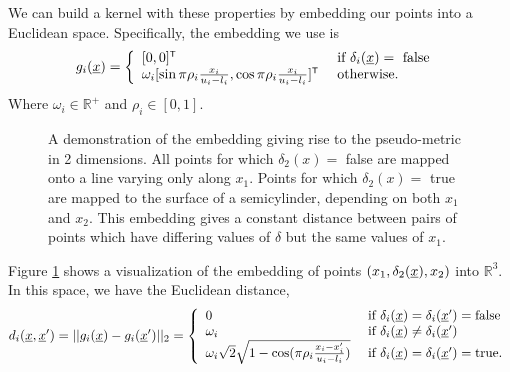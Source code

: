 \documentclass{article}
\newcommand{\vect}[1]{\underline{\smash{#1}}}
\renewcommand{\v}[1]{\vect{#1}}
\newcommand{\reals}{\mathds{R}}
\newcommand{\sX}{\mathcal{X}}
\newcommand{\br}{}%
\newcommand\transpose{{\textrm{\tiny{\sf{T}}}}}
\newcommand{\embeddingletter}{g}
\begin{document}
We can build a kernel with these properties by embedding our points into a Euclidean space.  Specifically, the embedding we use is
%
%
%
\begin{equation}
\embeddingletter_i\br(\v{x}) = \left\{\begin{array}{ll}
[0,0]^\transpose & \textrm{ if } \delta_i(\v{x}) = \textrm{ false }\\
\omega_i [\sin{\pi\rho_i\frac{x_i}{u_i-l_i}}, \cos{\pi\rho_i\frac{x_i}{u_i-l_i}}]^\transpose & \textrm{ otherwise.}\end{array}\right.
\end{equation}
Where $\omega_i \in \mathbb{R}^+$ and $\rho_i \in [0,1]$.
%
\begin{figure}

\caption{A demonstration of the embedding giving rise to the pseudo-metric in 2 dimensions.  All points for which $\delta_2(x) =$ false are mapped onto a line varying only along $x_1$.  Points for which $\delta_2(x) =$ true are mapped to the surface of a semicylinder, depending on both $x_1$ and $x_2$.  This embedding gives a constant distance between pairs of points which have differing values of $\delta$ but the same values of $x_1$.
}
\label{fig:cylinder}
\end{figure}

Figure \ref{fig:cylinder} shows a visualization of the embedding of points $(x_1, \delta_2(\v{x}), x_2)$ into $\reals^3$. 
%
In this space, we have the Euclidean distance,
%
\begin{equation}
d\br_i(\v{x}, \v{x}') = ||\embeddingletter_i\br(\v{x})-\embeddingletter_i\br(\v{x}')||_2 =\left\{\begin{array}{ll}
0 & \textrm{ if } \delta_i(\v{x}) = \delta_i(\v{x}') = \textrm{false}\\
\omega_i & \textrm{ if } \delta_i(\v{x}) \neq \delta_i(\v{x}')\\
\omega_i \sqrt{2} \sqrt{1 - \cos(\pi\rho_i \frac{x_i-x_i'}{u_i-l_i})} & \textrm{ if } \delta_i(\v{x}) = \delta_i(\v{x}') = \textrm{true}. \end{array}\right.
\label{eq:distance}
\end{equation}
\end{document}
